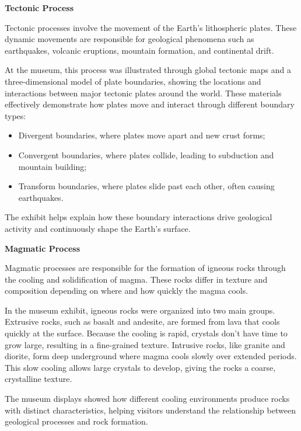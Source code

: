 \textbf{Tectonic Process}

Tectonic processes involve the movement of the Earth's lithospheric plates. These dynamic movements are responsible for geological phenomena such as earthquakes, volcanic eruptions, mountain formation, and continental drift.

At the museum, this process was illustrated through global tectonic maps and a three-dimensional model of plate boundaries, showing the locations and interactions between major tectonic plates around the world. These materials effectively demonstrate how plates move and interact through different boundary types:

\begin{itemize}
  \item Divergent boundaries, where plates move apart and new crust forms;
  \item Convergent boundaries, where plates collide, leading to subduction and mountain building;
  \item Transform boundaries, where plates slide past each other, often causing earthquakes.
\end{itemize}

The exhibit helps explain how these boundary interactions drive geological activity and continuously shape the Earth's surface.

\textbf{Magmatic Process}

Magmatic processes are responsible for the formation of igneous rocks through the cooling and solidification of magma. These rocks differ in texture and composition depending on where and how quickly the magma cools.

In the museum exhibit, igneous rocks were organized into two main groups. Extrusive rocks, such as basalt and andesite, are formed from lava that cools quickly at the surface. Because the cooling is rapid, crystals don't have time to grow large, resulting in a fine-grained texture. Intrusive rocks, like granite and diorite, form deep underground where magma cools slowly over extended periods. This slow cooling allows large crystals to develop, giving the rocks a coarse, crystalline texture.

The museum displays showed how different cooling environments produce rocks with distinct characteristics, helping visitors understand the relationship between geological processes and rock formation.

